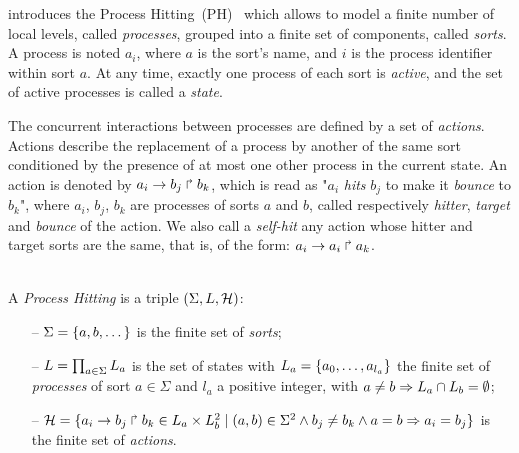 

 introduces the Process Hitting~(PH)~\cite{PMR10-TCSB}
which allows to model
a finite number of local levels,
called \emph{processes},
grouped into a finite set of components, called \emph{sorts}.
A process is noted $a_i$, where $a$ is the sort's name,
and $i$ is the process identifier within sort $a$.
At any time, exactly one process of each sort is \emph{active},
and the set of active processes is called a \emph{state}.

The concurrent interactions between processes are defined by a set of \emph{actions}.
Actions describe the replacement of a process by another of the same sort
conditioned by the presence of at most one other process in the current state.
An action is denoted by $a_i\rightarrow b_j\Rsh b_k$, which is read as
"$a_i$ \emph{hits} $b_j$ to make it \emph{bounce} to $b_k$",
where $a_i$, $b_j$, $b_k$ are processes of sorts $a$ and $b$,
called respectively \emph{hitter}, \emph{target} and
\emph{bounce} of the action.
We also call a \emph{self-hit} any action whose hitter and target sorts are the same,
that is, of the form: $a_i\rightarrow a_i\Rsh a_k$.

\begin{definition}\label{def:PH} \\
  A \emph{Process Hitting} is a triple $(\Sigma,L,\mathcal{H})$:
  \begin{itemize}
    \item[--]  $\Sigma = \{a,b,\dots\}$ is the finite set of \emph{sorts};
    \item[--]  $L = \prod_{a\in\Sigma} L_a$ is the set of states with
      $L_a = \{a_0,\dots,a_{l_a}\}$
      the finite set of \emph{processes} of sort $a\in\Sigma$
      and $l_a$ a positive integer, with $a\neq b\Rightarrow L_a \cap L_b = \emptyset$;
    \item[--]  $\mathcal{H} = \{ a_i\rightarrow b_j\Rsh b_k \in L_a \times L_b^2 \mid
      (a,b) \in \Sigma^2 \wedge b_j\neq b_k \wedge a=b\Rightarrow a_i=b_j\}$
      is the finite set of \emph{actions}.
  \end{itemize}
\end{definition}


